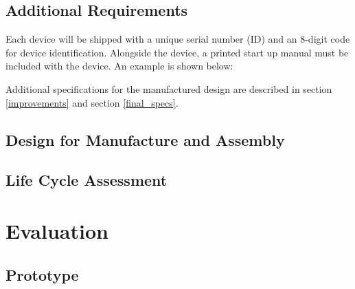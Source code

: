\documentclass{article}
\begin{document}




















\subsection{Additional Requirements}
Each device will be shipped with a unique serial number (ID) and an 8-digit code for device identification.
Alongside the device, a printed start up manual must be included with the device. An example is shown below:


Additional specifications for the manufactured design are described in section \ref{improvements} and section \ref{final_specs}.
\newpage

\subsection{Design for Manufacture and Assembly} \label{DMA}

\subsection{Life Cycle Assessment}


\newpage

\section{Evaluation} \label{eval}

\subsection{Prototype}



\end{document}

